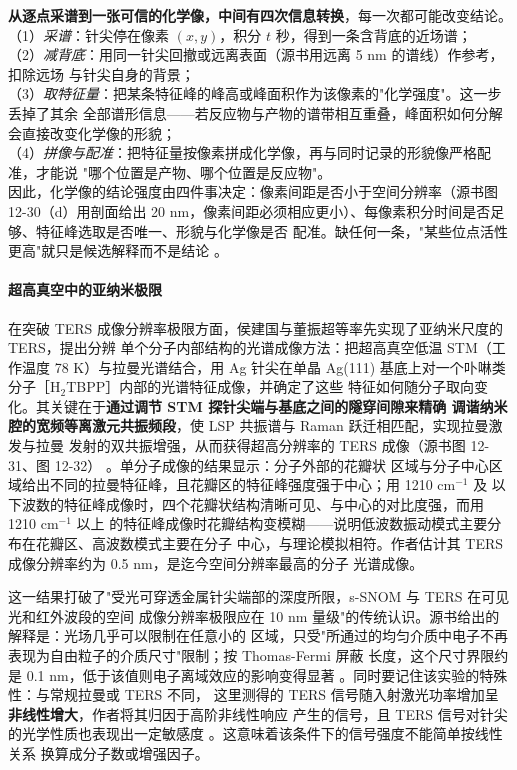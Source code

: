 \begin{dataflow}
\textbf{从逐点采谱到一张可信的化学像，中间有四次信息转换}，每一次都可能改变结论。\\
（1）\emph{采谱}：针尖停在像素 $(x,y)$，积分 $t$ 秒，得到一条含背底的近场谱；\\
（2）\emph{减背底}：用同一针尖回撤或远离表面（源书用远离 5 nm 的谱线）作参考，扣除远场
与针尖自身的背景；\\
（3）\emph{取特征量}：把某条特征峰的峰高或峰面积作为该像素的"化学强度"。这一步丢掉了其余
全部谱形信息——若反应物与产物的谱带相互重叠，峰面积如何分解会直接改变化学像的形貌；\\
（4）\emph{拼像与配准}：把特征量按像素拼成化学像，再与同时记录的形貌像严格配准，才能说
"哪个位置是产物、哪个位置是反应物"。\\
因此，化学像的结论强度由四件事决定：像素间距是否小于空间分辨率（源书图 12-30（d）用剖面给出
20 nm，像素间距必须相应更小）、每像素积分时间是否足够、特征峰选取是否唯一、形貌与化学像是否
配准。缺任何一条，"某些位点活性更高"就只是候选解释而不是结论
。
\end{dataflow}

\paragraph{超高真空中的亚纳米极限}
在突破 TERS 成像分辨率极限方面，侯建国与董振超等率先实现了亚纳米尺度的 TERS，提出分辨
单个分子内部结构的光谱成像方法：把超高真空低温 STM（工作温度 78 K）与拉曼光谱结合，用 Ag
针尖在单晶 Ag(111) 基底上对一个卟啉类分子［H$_2$TBPP］内部的光谱特征成像，并确定了这些
特征如何随分子取向变化。其关键在于\textbf{通过调节 STM 探针尖端与基底之间的隧穿间隙来精确
调谐纳米腔的宽频等离激元共振频段}，使 LSP 共振谱与 Raman 跃迁相匹配，实现拉曼激发与拉曼
发射的双共振增强，从而获得超高分辨率的 TERS 成像（源书图 12-31、图 12-32）
。单分子成像的结果显示：分子外部的花瓣状
区域与分子中心区域给出不同的拉曼特征峰，且花瓣区的特征峰强度强于中心；用 1210 cm$^{-1}$ 及
以下波数的特征峰成像时，四个花瓣状结构清晰可见、与中心的对比度强，而用 1210 cm$^{-1}$ 以上
的特征峰成像时花瓣结构变模糊——说明低波数振动模式主要分布在花瓣区、高波数模式主要在分子
中心，与理论模拟相符。作者估计其 TERS 成像分辨率约为 0.5 nm，是迄今空间分辨率最高的分子
光谱成像。

这一结果打破了"受光可穿透金属针尖端部的深度所限，s-SNOM 与 TERS 在可见光和红外波段的空间
成像分辨率极限应在 10 nm 量级"的传统认识。源书给出的解释是：光场几乎可以限制在任意小的
区域，只受"所通过的均匀介质中电子不再表现为自由粒子的介质尺寸"限制；按 Thomas-Fermi 屏蔽
长度，这个尺寸界限约是 0.1 nm，低于该值则电子离域效应的影响变得显著
。同时要记住该实验的特殊性：与常规拉曼或 TERS 不同，
这里测得的 TERS 信号随入射激光功率增加呈\textbf{非线性增大}，作者将其归因于高阶非线性响应
产生的信号，且 TERS 信号对针尖的光学性质也表现出一定敏感度
。这意味着该条件下的信号强度不能简单按线性关系
换算成分子数或增强因子。

